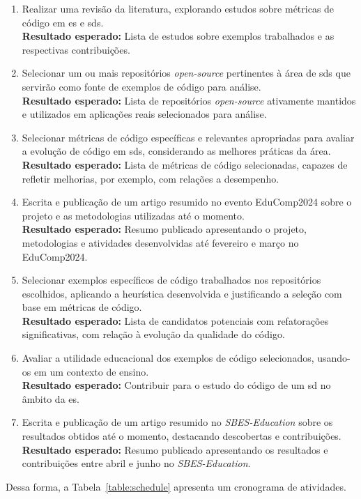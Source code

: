 \begin{enumerate}
    \item Realizar uma revisão da literatura, explorando estudos sobre métricas de código em \gls{es} e \gls{sds}.
    \\\textbf{Resultado esperado:} Lista de estudos sobre exemplos trabalhados e as respectivas contribuições.

    \item Selecionar um ou mais repositórios \textit{open-source} pertinentes à área de \gls{sds} que servirão como fonte de exemplos de código para análise.
    \\\textbf{Resultado esperado:} Lista de repositórios \textit{open-source} ativamente mantidos e utilizados em aplicações reais selecionados para análise.

    \item Selecionar métricas de código específicas e relevantes apropriadas para avaliar a evolução de código em \gls{sds}, considerando as melhores práticas da área.
    \\\textbf{Resultado esperado:} Lista de métricas de código selecionadas, capazes de refletir melhorias, por exemplo, com relações a desempenho.

    \item Escrita e publicação de um artigo resumido no evento EduComp2024 sobre o projeto e as metodologias utilizadas até o momento.
    \\\textbf{Resultado esperado:} Resumo publicado apresentando o projeto, metodologias e atividades desenvolvidas até fevereiro e março no EduComp2024.

    \item Selecionar exemplos específicos de código trabalhados nos repositórios escolhidos, aplicando a heurística desenvolvida e justificando a seleção com base em métricas de código.
    \\\textbf{Resultado esperado:} Lista de candidatos potenciais com refatorações significativas, com relação à evolução da qualidade do código.

    \item Avaliar a utilidade educacional dos exemplos de código selecionados, usando-os em um contexto de ensino.
    \\\textbf{Resultado esperado:} Contribuir para o estudo do código de um \gls{sd} no âmbito da \gls{es}.

    \item Escrita e publicação de um artigo resumido no \textit{SBES-Education} sobre os resultados obtidos até o momento, destacando descobertas e contribuições.
    \\\textbf{Resultado esperado:} Resumo publicado apresentando os resultados e contribuições entre abril e junho no \textit{SBES-Education}.
\end{enumerate}

Dessa forma, a Tabela~\ref{table:schedule} apresenta um cronograma de atividades.